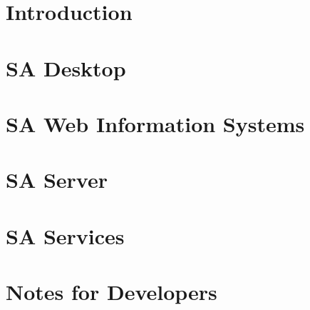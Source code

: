 \documentclass[10pt,twoside,openany,bibtotoc,liststotoc,chapterprefix]{scrbook}
\begin{document}
\mainmatter
\part{Introduction}



\part{SA Desktop}




%

\part{SA Web Information Systems}


%

\part{SA Server}


\part{SA Services}


\part{Notes for Developers}



\backmatter
\appendix


\end{document}
